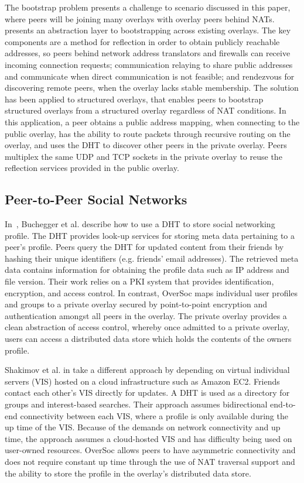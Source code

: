 \documentclass{IEEEtran}
\begin{document}
The bootstrap problem presents a challenge to scenario discussed in this paper,
where peers will be joining many overlays with overlay peers behind NATs.
\cite{bootstrapping} presents an abstraction layer to bootstrapping across
existing overlays.  The key components are a method for reflection in order to
obtain publicly reachable addresses, so peers behind network address
translators and firewalls can receive incoming connection requests;
communication relaying to share public addresses and communicate when direct
communication is not feasible; and rendezvous for discovering remote peers,
when the overlay lacks stable membership.  The solution has been applied to
structured overlays, that enables peers to bootstrap structured overlays from a
structured overlay regardless of NAT conditions.  In this application, a peer
obtains a public address mapping, when connecting to the public overlay, has
the ability to route packets through recursive routing on the overlay, and uses
the DHT to discover other peers in the private overlay.  Peers multiplex the
same UDP and TCP sockets in the private overlay to reuse the reflection
services provided in the public overlay.

\subsection{Peer-to-Peer Social Networks}

In~\cite{peerson}, Buchegger et al. describe how to use a DHT to store social
networking profile.  The DHT provides look-up services for storing meta data
pertaining to a peer's profile.  Peers query the DHT for updated content from
their friends by hashing their unique identifiers (e.g. friends' email
addresses).  The retrieved meta data contains information for obtaining the
profile data such as IP address and file version. Their work relies on a PKI
system that provides identification, encryption, and access control.  In
contrast, OverSoc maps individual user profiles and groups to a private overlay
secured by point-to-point encryption and authentication amongst all peers in
the overlay.  The private overlay provides a clean abstraction of access
control, whereby once admitted to a private overlay, users can access a
distributed data store which holds the contents of the owners profile.

Shakimov et al. in \cite{vis-a-vis} take a different approach by depending on
virtual individual servers (VIS) hosted on a cloud infrastructure such as
Amazon EC2. Friends contact each other's VIS directly for updates.  A DHT is
used as a directory for groups and interest-based searches. Their approach
assumes bidirectional end-to-end connectivity between each VIS, where a profile
is only available during the up time of the VIS.  Because of the demands on
network connectivity and up time, the approach assumes a cloud-hosted VIS and
has difficulty being used on user-owned resources.  OverSoc allows peers to
have  asymmetric connectivity and does not require constant up time through the
use of NAT traversal support and the ability to store the profile in the
overlay's distributed data store.
\end{document}
